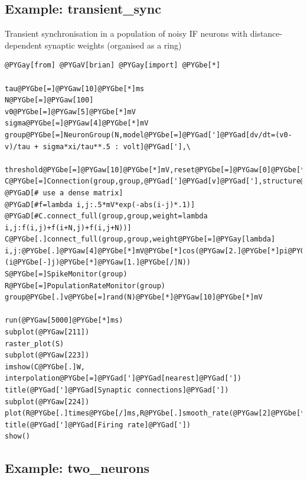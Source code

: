 \documentclass[letterpaper,10pt]{manual}
\begin{document}
\resetcurrentobjects
{}

\hypertarget{index-59}{}\subsection{Example: transient\_sync}

Transient synchronisation in a population of noisy IF neurons
with distance-dependent synaptic weights (organised as a ring)

\begin{Verbatim}[commandchars=@\[\]]
@PYGay[from] @PYGaV[brian] @PYGay[import] @PYGbe[*]

tau@PYGbe[=]@PYGaw[10]@PYGbe[*]ms
N@PYGbe[=]@PYGaw[100]
v0@PYGbe[=]@PYGaw[5]@PYGbe[*]mV
sigma@PYGbe[=]@PYGaw[4]@PYGbe[*]mV
group@PYGbe[=]NeuronGroup(N,model@PYGbe[=]@PYGad[']@PYGad[dv/dt=(v0-v)/tau + sigma*xi/tau**.5 : volt]@PYGad['],\
                  threshold@PYGbe[=]@PYGaw[10]@PYGbe[*]mV,reset@PYGbe[=]@PYGaw[0]@PYGbe[*]mV)
C@PYGbe[=]Connection(group,group,@PYGad[']@PYGad[v]@PYGad['],structure@PYGbe[=]@PYGad[']@PYGad[dense]@PYGad[']) @PYGaD[# use a dense matrix]
@PYGaD[#f=lambda i,j:.5*mV*exp(-abs(i-j)*.1)]
@PYGaD[#C.connect_full(group,group,weight=lambda i,j:f(i,j)+f(i+N,j)+f(i,j+N))]
C@PYGbe[.]connect_full(group,group,weight@PYGbe[=]@PYGay[lambda] i,j:@PYGbe[.]@PYGaw[4]@PYGbe[*]mV@PYGbe[*]cos(@PYGaw[2.]@PYGbe[*]pi@PYGbe[*](i@PYGbe[-]j)@PYGbe[*]@PYGaw[1.]@PYGbe[/]N))
S@PYGbe[=]SpikeMonitor(group)
R@PYGbe[=]PopulationRateMonitor(group)
group@PYGbe[.]v@PYGbe[=]rand(N)@PYGbe[*]@PYGaw[10]@PYGbe[*]mV

run(@PYGaw[5000]@PYGbe[*]ms)
subplot(@PYGaw[211])
raster_plot(S)
subplot(@PYGaw[223])
imshow(C@PYGbe[.]W, interpolation@PYGbe[=]@PYGad[']@PYGad[nearest]@PYGad['])
title(@PYGad[']@PYGad[Synaptic connections]@PYGad['])
subplot(@PYGaw[224])
plot(R@PYGbe[.]times@PYGbe[/]ms,R@PYGbe[.]smooth_rate(@PYGaw[2]@PYGbe[*]ms,@PYGaX[filter]@PYGbe[=]@PYGad[']@PYGad[flat]@PYGad[']))
title(@PYGad[']@PYGad[Firing rate]@PYGad['])
show()
\end{Verbatim}

\resetcurrentobjects
{}

\hypertarget{index-60}{}\subsection{Example: two\_neurons}
\end{document}
